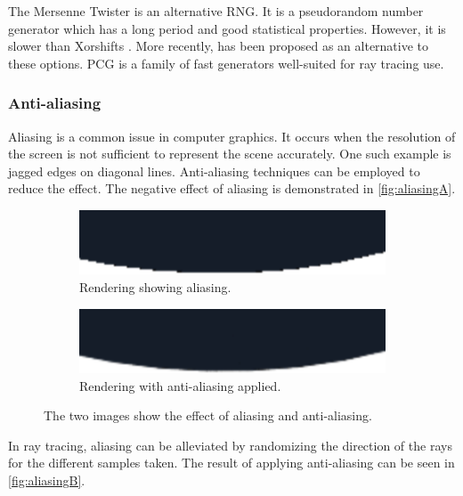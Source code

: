 The Mersenne Twister \cite{rngMersenneTwister} is an alternative \gls{RNG}. It is a pseudorandom number generator which has a long period and good statistical properties. However, it is slower than Xorshifts \cite{o2014pcg}. More recently,  has been proposed as an alternative to these options. \gls{PCG} is a family of fast generators well-suited for ray tracing use.

\subsubsection{Anti-aliasing}
\label{sec:anti-aliasing}

Aliasing is a common issue in computer graphics. It occurs when the resolution of the screen is not sufficient to represent the scene accurately. One such example is jagged edges on diagonal lines. Anti-aliasing techniques can be employed to reduce the effect. The negative effect of aliasing is demonstrated in \autoref{fig:aliasingA}.

\begin{figure}[H]
  \centering
  \begin{subfigure}[b]{0.45\textwidth}
    \includegraphics[width=\textwidth]{resources/aliasing.png}
    \caption{Rendering showing aliasing.}
    \label{fig:aliasingA}
  \end{subfigure}
  \hfill
  \begin{subfigure}[b]{0.45\textwidth}
    \includegraphics[width=\textwidth]{resources/anti-aliasing.png}
    \caption{Rendering with anti-aliasing applied.}
    \label{fig:aliasingB}
  \end{subfigure}
  \caption{The two images show the effect of aliasing and anti-aliasing.}
  \label{fig:aliasing}
\end{figure}

In ray tracing, aliasing can be alleviated by randomizing the direction of the rays for the different samples taken. The result of applying anti-aliasing can be seen in \autoref{fig:aliasingB}.


